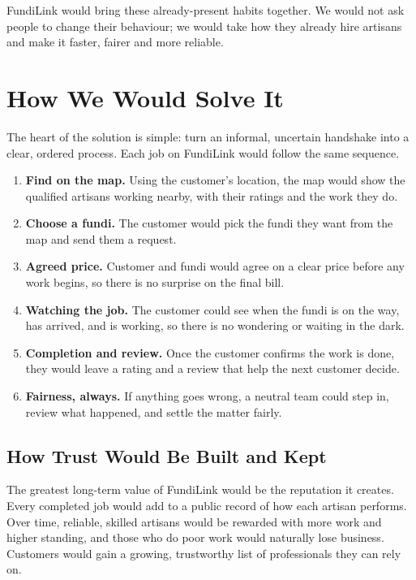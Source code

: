\documentclass[11pt,a4paper]{article}
\begin{document}
FundiLink would bring these already-present habits together. We would not ask people to change
their behaviour; we would take how they already hire artisans and make it faster, fairer and
more reliable.

\section{How We Would Solve It}

The heart of the solution is simple: turn an informal, uncertain handshake into a clear,
ordered process. Each job on FundiLink would follow the same sequence.

\begin{enumerate}[leftmargin=1.5em]
    \item \textbf{Find on the map.} Using the customer's location, the map would show the
          qualified artisans working nearby, with their ratings and the work they do.
    \item \textbf{Choose a fundi.} The customer would pick the fundi they want from the map and
          send them a request.
    \item \textbf{Agreed price.} Customer and fundi would agree on a clear price before any
          work begins, so there is no surprise on the final bill.
    \item \textbf{Watching the job.} The customer could see when the fundi is on the way, has
          arrived, and is working, so there is no wondering or waiting in the dark.
    \item \textbf{Completion and review.} Once the customer confirms the work is done, they
          would leave a rating and a review that help the next customer decide.
    \item \textbf{Fairness, always.} If anything goes wrong, a neutral team could step in,
          review what happened, and settle the matter fairly.
\end{enumerate}

\subsection{How Trust Would Be Built and Kept}

The greatest long-term value of FundiLink would be the reputation it creates. Every completed
job would add to a public record of how each artisan performs. Over time, reliable, skilled
artisans would be rewarded with more work and higher standing, and those who do poor work
would naturally lose business. Customers would gain a growing, trustworthy list of
professionals they can rely on.
\end{document}
